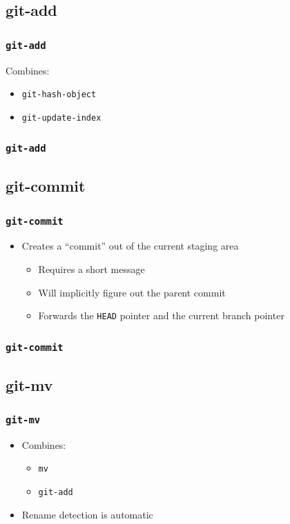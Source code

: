 \documentclass{beamer}
\begin{document}
\subsection{git-add}
\begin{frame}
\frametitle{\texttt{git-add}}
Combines:
\begin{itemize}
\item<1->{\texttt{git-hash-object}}
\item<2->{\texttt{git-update-index}}
\end{itemize}
\end{frame}

\begin{frame}[fragile]
\frametitle{\texttt{git-add}}

\end{frame}

\subsection{git-commit}
\begin{frame}
\frametitle{\texttt{git-commit}}
\begin{itemize}
\item{Creates a ``commit'' out of the current staging area}
\begin{itemize}
\item{Requires a short message}
\item{Will implicitly figure out the parent commit}
\item{Forwards the \texttt{HEAD} pointer and the current branch pointer}
\end{itemize}
\end{itemize}
\end{frame}

\begin{frame}[fragile]
\frametitle{\texttt{git-commit}}

\end{frame}

\subsection{git-mv}
\begin{frame}
\frametitle{\texttt{git-mv}}
\begin{itemize}
\item{Combines:}
\begin{itemize}
\item{\texttt{mv}}
\item{\texttt{git-add}}
\end{itemize}
\item{Rename detection is automatic}
\end{itemize}
\end{frame}
\end{document}
